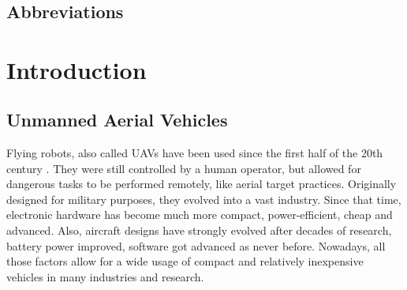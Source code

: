 


\conditionalClearPage



\conditionalClearPage




\conditionalClearPage

\begin{changemargin}{0.8cm}{0.8cm}

~\vfill{}

\section*{Abbreviations}



\vskip 2.5cm

\end{changemargin}

\conditionalClearPage


\tableofcontents

\conditionalClearPage

\pagestyle{full}


\chapter{Introduction}


\section{Unmanned Aerial Vehicles}
Flying robots, also called \acs{UAV}s have been used since the first half of the 20th century \cite{keane2013brief}. They were still controlled by a human operator, but allowed for dangerous tasks to be performed remotely, like aerial target practices. Originally designed for military purposes, they evolved into a vast industry. Since that time, electronic hardware has become much more compact, power-efficient, cheap and advanced. Also, aircraft designs have strongly evolved after decades of research, battery power improved, software got advanced as never before. Nowadays, all those factors allow for a wide usage of compact and relatively inexpensive vehicles in many industries and research. 

